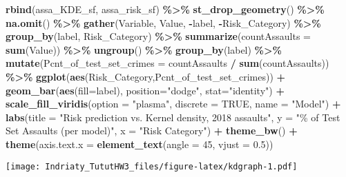 \documentclass[
]{article}
\newenvironment{Shaded}{\begin{snugshade}}{\end{snugshade}}
\newcommand{\AttributeTok}[1]{\textcolor[rgb]{0.13,0.29,0.53}{#1}}
\newcommand{\ConstantTok}[1]{\textcolor[rgb]{0.56,0.35,0.01}{#1}}
\newcommand{\DecValTok}[1]{\textcolor[rgb]{0.00,0.00,0.81}{#1}}
\newcommand{\FloatTok}[1]{\textcolor[rgb]{0.00,0.00,0.81}{#1}}
\newcommand{\FunctionTok}[1]{\textcolor[rgb]{0.13,0.29,0.53}{\textbf{#1}}}
\newcommand{\NormalTok}[1]{#1}
\newcommand{\SpecialCharTok}[1]{\textcolor[rgb]{0.81,0.36,0.00}{\textbf{#1}}}
\newcommand{\StringTok}[1]{\textcolor[rgb]{0.31,0.60,0.02}{#1}}
\begin{document}
\begin{Shaded}
\begin{Highlighting}[]
\FunctionTok{rbind}\NormalTok{(assa\_KDE\_sf, assa\_risk\_sf) }\SpecialCharTok{\%\textgreater{}\%}
  \FunctionTok{st\_drop\_geometry}\NormalTok{() }\SpecialCharTok{\%\textgreater{}\%}
  \FunctionTok{na.omit}\NormalTok{() }\SpecialCharTok{\%\textgreater{}\%}
  \FunctionTok{gather}\NormalTok{(Variable, Value, }\SpecialCharTok{{-}}\NormalTok{label, }\SpecialCharTok{{-}}\NormalTok{Risk\_Category) }\SpecialCharTok{\%\textgreater{}\%}
  \FunctionTok{group\_by}\NormalTok{(label, Risk\_Category) }\SpecialCharTok{\%\textgreater{}\%}
  \FunctionTok{summarize}\NormalTok{(}\AttributeTok{countAssaults =} \FunctionTok{sum}\NormalTok{(Value)) }\SpecialCharTok{\%\textgreater{}\%}
  \FunctionTok{ungroup}\NormalTok{() }\SpecialCharTok{\%\textgreater{}\%}
  \FunctionTok{group\_by}\NormalTok{(label) }\SpecialCharTok{\%\textgreater{}\%}
  \FunctionTok{mutate}\NormalTok{(}\AttributeTok{Pcnt\_of\_test\_set\_crimes =}\NormalTok{ countAssaults }\SpecialCharTok{/} \FunctionTok{sum}\NormalTok{(countAssaults)) }\SpecialCharTok{\%\textgreater{}\%}
    \FunctionTok{ggplot}\NormalTok{(}\FunctionTok{aes}\NormalTok{(Risk\_Category,Pcnt\_of\_test\_set\_crimes)) }\SpecialCharTok{+}
      \FunctionTok{geom\_bar}\NormalTok{(}\FunctionTok{aes}\NormalTok{(}\AttributeTok{fill=}\NormalTok{label), }\AttributeTok{position=}\StringTok{"dodge"}\NormalTok{, }\AttributeTok{stat=}\StringTok{"identity"}\NormalTok{) }\SpecialCharTok{+}
      \FunctionTok{scale\_fill\_viridis}\NormalTok{(}\AttributeTok{option =} \StringTok{"plasma"}\NormalTok{, }\AttributeTok{discrete =} \ConstantTok{TRUE}\NormalTok{, }\AttributeTok{name =} \StringTok{"Model"}\NormalTok{) }\SpecialCharTok{+}
      \FunctionTok{labs}\NormalTok{(}\AttributeTok{title =} \StringTok{"Risk prediction vs. Kernel density, 2018 assaults"}\NormalTok{,}
           \AttributeTok{y =} \StringTok{"\% of Test Set Assaults (per model)"}\NormalTok{,}
           \AttributeTok{x =} \StringTok{"Risk Category"}\NormalTok{) }\SpecialCharTok{+}
  \FunctionTok{theme\_bw}\NormalTok{() }\SpecialCharTok{+}
      \FunctionTok{theme}\NormalTok{(}\AttributeTok{axis.text.x =} \FunctionTok{element\_text}\NormalTok{(}\AttributeTok{angle =} \DecValTok{45}\NormalTok{, }\AttributeTok{vjust =} \FloatTok{0.5}\NormalTok{))}
\end{Highlighting}
\end{Shaded}

\texttt{[image: Indriaty\_TututHW3\_files/figure-latex/kdgraph-1.pdf]}
\end{document}
